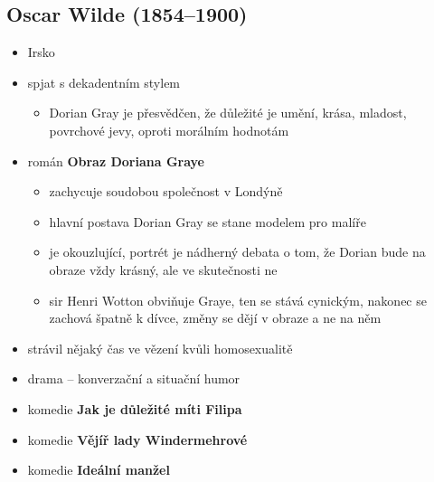 \subsection{Oscar Wilde (1854--1900)}
\begin{itemize}
\item Irsko
\item spjat s dekadentním stylem
	\begin{itemize}
	\item Dorian Gray je přesvědčen, že důležité je umění, krása, mladost, povrchové jevy, oproti morálním hodnotám
	\end{itemize}
\item román \textbf{Obraz Doriana Graye}
	\begin{itemize}
	\item zachycuje soudobou společnost v Londýně
	\item hlavní postava Dorian Gray se stane modelem pro malíře
	\item je okouzlující, portrét je nádherný \ra debata o tom, že Dorian bude na obraze vždy krásný, ale ve skutečnosti ne
	\item sir Henri Wotton obviňuje Graye, ten se stává cynickým, nakonec se zachová špatně k dívce, změny se dějí v obraze a ne na něm  
	\end{itemize}
\item strávil nějaký čas ve vězení kvůli homosexualitě
\item drama -- konverzační a situační humor
\item komedie \textbf{Jak je důležité míti Filipa}
\item komedie \textbf{Vějíř lady Windermehrové}
\item komedie \textbf{Ideální manžel}
\end{itemize}


